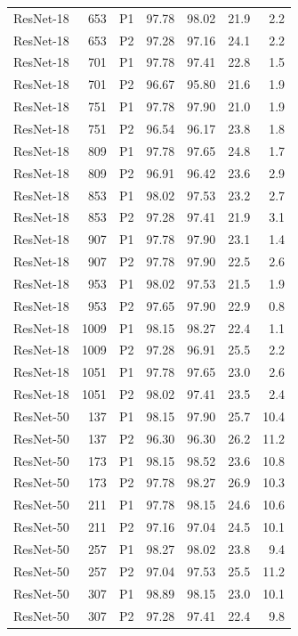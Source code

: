 {\begin{longtable}{lrlrrrr}
ResNet-18 & 653 & P1 & 97.78 & 98.02 & 21.9 & 2.2 \\
ResNet-18 & 653 & P2 & 97.28 & 97.16 & 24.1 & 2.2 \\
ResNet-18 & 701 & P1 & 97.78 & 97.41 & 22.8 & 1.5 \\
ResNet-18 & 701 & P2 & 96.67 & 95.80 & 21.6 & 1.9 \\
ResNet-18 & 751 & P1 & 97.78 & 97.90 & 21.0 & 1.9 \\
ResNet-18 & 751 & P2 & 96.54 & 96.17 & 23.8 & 1.8 \\
ResNet-18 & 809 & P1 & 97.78 & 97.65 & 24.8 & 1.7 \\
ResNet-18 & 809 & P2 & 96.91 & 96.42 & 23.6 & 2.9 \\
ResNet-18 & 853 & P1 & 98.02 & 97.53 & 23.2 & 2.7 \\
ResNet-18 & 853 & P2 & 97.28 & 97.41 & 21.9 & 3.1 \\
ResNet-18 & 907 & P1 & 97.78 & 97.90 & 23.1 & 1.4 \\
ResNet-18 & 907 & P2 & 97.78 & 97.90 & 22.5 & 2.6 \\
ResNet-18 & 953 & P1 & 98.02 & 97.53 & 21.5 & 1.9 \\
ResNet-18 & 953 & P2 & 97.65 & 97.90 & 22.9 & 0.8 \\
ResNet-18 & 1009 & P1 & 98.15 & 98.27 & 22.4 & 1.1 \\
ResNet-18 & 1009 & P2 & 97.28 & 96.91 & 25.5 & 2.2 \\
ResNet-18 & 1051 & P1 & 97.78 & 97.65 & 23.0 & 2.6 \\
ResNet-18 & 1051 & P2 & 98.02 & 97.41 & 23.5 & 2.4 \\
ResNet-50 & 137 & P1 & 98.15 & 97.90 & 25.7 & 10.4 \\
ResNet-50 & 137 & P2 & 96.30 & 96.30 & 26.2 & 11.2 \\
ResNet-50 & 173 & P1 & 98.15 & 98.52 & 23.6 & 10.8 \\
ResNet-50 & 173 & P2 & 97.78 & 98.27 & 26.9 & 10.3 \\
ResNet-50 & 211 & P1 & 97.78 & 98.15 & 24.6 & 10.6 \\
ResNet-50 & 211 & P2 & 97.16 & 97.04 & 24.5 & 10.1 \\
ResNet-50 & 257 & P1 & 98.27 & 98.02 & 23.8 & 9.4 \\
ResNet-50 & 257 & P2 & 97.04 & 97.53 & 25.5 & 11.2 \\
ResNet-50 & 307 & P1 & 98.89 & 98.15 & 23.0 & 10.1 \\
ResNet-50 & 307 & P2 & 97.28 & 97.41 & 22.4 & 9.8 \\

\end{longtable}}
